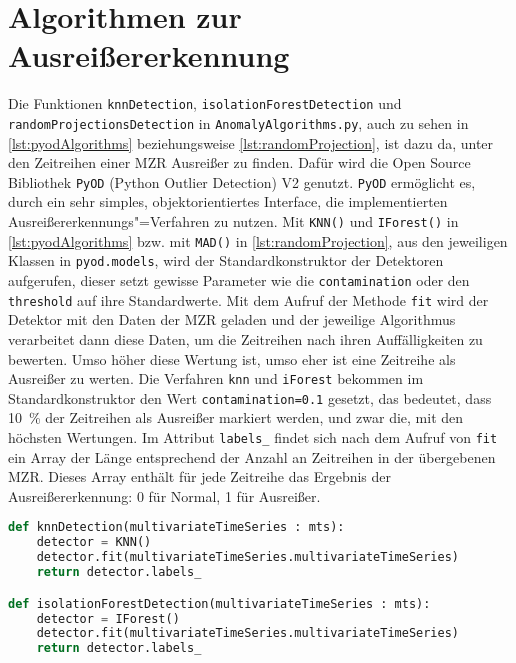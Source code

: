 \section{Algorithmen zur Ausreißererkennung}
Die Funktionen \lstinline|knnDetection|, \lstinline|isolationForestDetection| und \texttt{randomProjectionsDetec\allowbreak tion} in \texttt{AnomalyAlgorithms.py}, auch zu sehen in \autoref{lst:pyodAlgorithms} beziehungsweise \autoref{lst:randomProjection}, ist dazu da, unter den Zeitreihen einer \ac{MZR} Ausreißer zu finden. Dafür wird die Open Source Bibliothek \lstinline|PyOD| (Python Outlier Detection) V2 \cite{pyod} genutzt. \lstinline|PyOD| ermöglicht es, durch ein sehr simples, objektorientiertes Interface, die implementierten Ausreißererkennungs"=Verfahren zu nutzen. Mit \lstinline|KNN()| und \lstinline|IForest()| in \autoref{lst:pyodAlgorithms} bzw. mit \lstinline|MAD()| in \autoref{lst:randomProjection}, aus den jeweiligen Klassen in \lstinline|pyod.models|, wird der Standardkonstruktor der Detektoren aufgerufen, dieser setzt gewisse Parameter wie die \lstinline|contamination| oder den \lstinline|threshold| auf ihre Standardwerte. Mit dem Aufruf der Methode \lstinline|fit| wird der Detektor mit den Daten der \ac{MZR} geladen und der jeweilige Algorithmus verarbeitet dann diese Daten, um die Zeitreihen nach ihren Auffälligkeiten zu bewerten. Umso höher diese Wertung ist, umso eher ist eine Zeitreihe als Ausreißer zu werten. Die Verfahren \lstinline|knn| und \lstinline|iForest| bekommen im Standardkonstruktor den Wert \lstinline|contamination=0.1| gesetzt, das bedeutet, dass 10~\% der Zeitreihen als Ausreißer markiert werden, und zwar die, mit den höchsten Wertungen. Im Attribut \lstinline|labels_| findet sich nach dem Aufruf von \lstinline|fit| ein Array der Länge entsprechend der Anzahl an Zeitreihen in der übergebenen \ac{MZR}. Dieses Array enthält für jede Zeitreihe das Ergebnis der Ausreißererkennung: 0 für Normal, 1 für Ausreißer.
\begin{lstlisting}[caption={knn"= und iForest"=Detection}, label=lst:pyodAlgorithms, style=Python, language=Python]
def knnDetection(multivariateTimeSeries : mts):
    detector = KNN()
    detector.fit(multivariateTimeSeries.multivariateTimeSeries)
    return detector.labels_

def isolationForestDetection(multivariateTimeSeries : mts):
    detector = IForest()
    detector.fit(multivariateTimeSeries.multivariateTimeSeries)
    return detector.labels_
\end{lstlisting}

